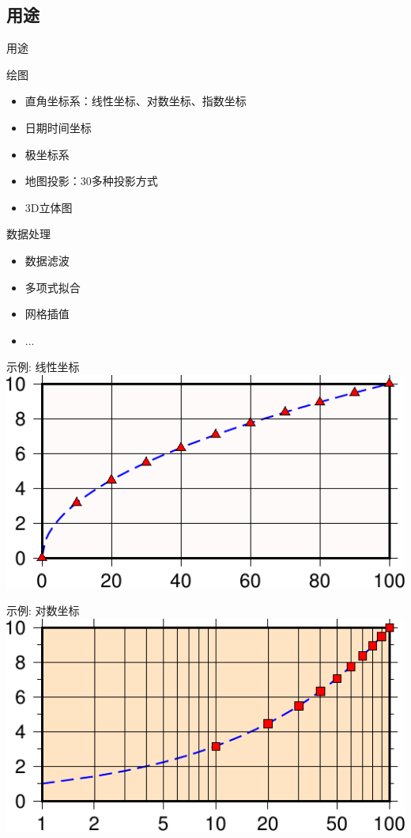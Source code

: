 \documentclass[UTF8, 11pt]{ctexbeamer}
\begin{document}
\subsection{用途}
\begin{frame}{用途}
\begin{block}{绘图}
\begin{itemize}
\item 直角坐标系：线性坐标、对数坐标、指数坐标
\item 日期时间坐标
\item 极坐标系
\item 地图投影：30多种投影方式
\item 3D立体图
\end{itemize}
\end{block}
\begin{block}{数据处理}
\begin{itemize}
\item 数据滤波
\item 多项式拟合
\item 网格插值
\item ...
\end{itemize}
\end{block}
\end{frame}
\begin{frame}{示例: 线性坐标}
\includegraphics[width=\textwidth]{GMT_JX_linear}
\end{frame}
\begin{frame}{示例: 对数坐标}
\includegraphics[width=\textwidth]{GMT_JX_log}
\end{frame}
\end{document}
